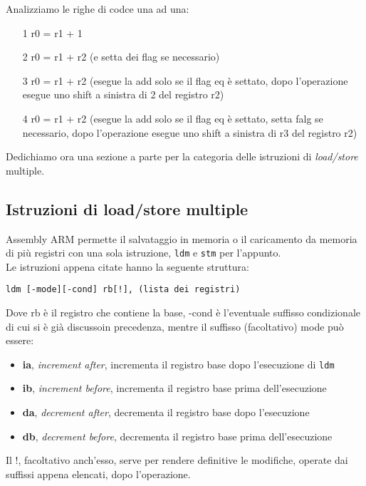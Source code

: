 \documentclass[class=book, crop=false, oneside]{standalone}
\begin{document}
Analizziamo le righe di codce una ad una:
\begin{itemize}
	\item [1] r0 = r1 + 1
	\item [2] r0 = r1 + r2 (e setta dei flag se necessario)
	\item [3] r0 = r1 + r2 (esegue la add solo se il flag eq è settato, dopo l'operazione esegue uno shift a sinistra di 2 del registro r2)
	\item [4] r0 = r1 + r2 (esegue la add solo se il flag eq è settato, setta falg se necessario, dopo l'operazione esegue uno shift a sinistra di r3 del registro r2)
\end{itemize}

Dedichiamo ora una sezione a parte per la categoria delle istruzioni di \emph{load/store} multiple.

\subsection*{Istruzioni di load/store multiple}
Assembly ARM permette il salvataggio in memoria o il caricamento da memoria di più registri con una sola istruzione, \texttt{ldm} e \texttt{stm} per l'appunto.\\
Le istruzioni appena citate hanno la seguente struttura:

\begin{verbatim}
ldm [-mode][-cond] rb[!], (lista dei registri)
\end{verbatim}

Dove rb è il registro che contiene la base, -cond è l'eventuale suffisso condizionale di cui si è già discussoin precedenza, mentre il suffisso (facoltativo) mode può essere:

\begin{itemize}[nolistsep]
	\item \textbf{ia}, \emph{increment after}, incrementa il registro base dopo l'esecuzione di \texttt{ldm}
	\item \textbf{ib}, \emph{increment before}, incrementa il registro base prima dell'esecuzione
	\item \textbf{da}, \emph{decrement after}, decrementa il registro base dopo l'esecuzione
	\item \textbf{db}, \emph{decrement before}, decrementa il registro base prima dell'esecuzione
\end{itemize}

Il !, facoltativo anch'esso, serve per rendere definitive le modifiche, operate dai suffissi appena elencati, dopo l'operazione.
\end{document}
